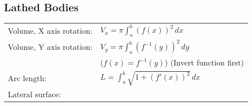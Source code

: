 \subsection*{Lathed Bodies}

\bgroup
    \def\arraystretch{1.2}
    \begin{tabular}{ll}
        Volume, X axis rotation: &
        $V_x = \pi\int_a^b\left(f(x)\right)^2\,dx$ \\

        Volume, Y axis rotation: &
        $V_y = \pi\int_a^b\left(f^{-1}(y)\right)^2\,dy$ \\
        & ($f(x) = f^{-1}(y)$) (Invert function first) \\

        Arc length: &
        $L = \int_a^b \sqrt{1+\left(f'(x)\right)^2}\,dx$ \\

        Lateral surface: &
        \\
    \end{tabular}
\egroup
